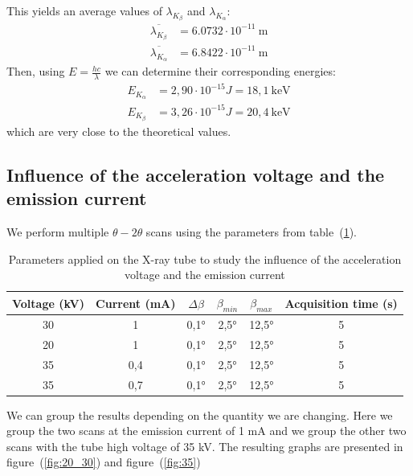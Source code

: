 \documentclass{scrartcl}
\begin{document}
\noindent This yields an average values of $\lambda_{K_\beta}$ and $\lambda_{K_\alpha}$: \begin{align} \overline{\lambda_{K_\beta}} &= 6.0732 \cdot 10^{-11} \ \text{m} \nonumber \\ \overline{\lambda_{K_\alpha}} &= 6.8422 \cdot 10^{-11} \ \text{m} \nonumber \end{align}
Then, using $E = \frac{hc}{\lambda}$ we can determine their corresponding energies: \begin{align}\nonumber
    E_{K_{\alpha}} &= 2,90 \cdot 10^{-15} J = 18,1\ \text{keV}\\ \nonumber
    E_{K_{\beta}}  &= 3,26 \cdot 10^{-15} J = 20,4 \ \text{keV}
\end{align} which are very close to the theoretical values.

\subsection{Influence of the acceleration voltage and the emission current}

\noindent We perform multiple $\theta-2\theta$ scans using the parameters from table~(\ref{tab:parametersInfluenceAccVoltageEmissionCurrent}).

\begin{table}[h]
    \centering
    \begin{tabular}{c|c|c|c|c|c}
    Voltage (kV) & Current (mA) & $\Delta \beta$ & $\beta_{min}$   &  $\beta_{max}$   &  Acquisition time (s) \\
    \hline
    30  & 1 & 0,1° & 2,5° & 12,5° & 5 \\
    20 & 1 & 0,1° & 2,5° & 12,5° & 5 \\
    35 & 0,4 & 0,1° & 2,5° & 12,5° & 5 \\
    35 & 0,7 & 0,1° & 2,5° & 12,5° & 5
    \end{tabular}
    \caption{Parameters applied on the X-ray tube to study the influence of the acceleration voltage and the emission current}
    \label{tab:parametersInfluenceAccVoltageEmissionCurrent}
\end{table}

\noindent We can group the results depending on the quantity we are changing. Here we group the two scans at the emission current of 1 mA and we group the other two scans with the tube high voltage of 35 kV. The resulting graphs are presented in figure~(\ref{fig:20_30}) and figure~(\ref{fig:35}) 
\end{document}
